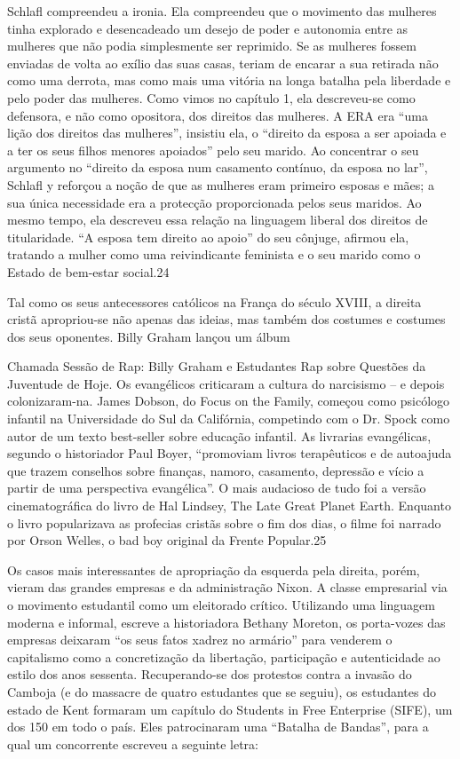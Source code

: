  \par 
Schlafl compreendeu a ironia. Ela compreendeu que o movimento das mulheres tinha explorado e desencadeado um desejo de poder e autonomia entre as mulheres que não podia simplesmente ser reprimido. Se as mulheres fossem enviadas de volta ao exílio das suas casas, teriam de encarar a sua retirada não como uma derrota, mas como mais uma vitória na longa batalha pela liberdade e pelo poder das mulheres. Como vimos no capítulo 1, ela descreveu-se como defensora, e não como opositora, dos direitos das mulheres. A ERA era “uma lição dos direitos das mulheres”, insistiu ela, o “direito da esposa a ser apoiada e a ter os seus filhos menores apoiados” pelo seu marido. Ao concentrar o seu argumento no “direito da esposa num casamento contínuo, da esposa no lar”, Schlafl y reforçou a noção de que as mulheres eram primeiro esposas e mães; a sua única necessidade era a protecção proporcionada pelos seus maridos. Ao mesmo tempo, ela descreveu essa relação na linguagem liberal dos direitos de titularidade. “A esposa tem direito ao apoio” do seu cônjuge, afirmou ela, tratando a mulher como uma reivindicante feminista e o seu marido como o Estado de bem-estar social.{\color{blue}24}
 \par 
Tal como os seus antecessores católicos na França do século XVIII, a direita cristã apropriou-se não apenas das ideias, mas também dos costumes e costumes dos seus oponentes. Billy Graham lançou um álbum
 \par 
Chamada Sessão de Rap: Billy Graham e Estudantes Rap sobre Questões da Juventude de Hoje. Os evangélicos criticaram a cultura do narcisismo – e depois colonizaram-na. James Dobson, do Focus on the Family, começou como psicólogo infantil na Universidade do Sul da Califórnia, competindo com o Dr. Spock como autor de um texto best-seller sobre educação infantil. As livrarias evangélicas, segundo o historiador Paul Boyer, “promoviam livros terapêuticos e de autoajuda que trazem conselhos sobre finanças, namoro, casamento, depressão e vício a partir de uma perspectiva evangélica”. O mais audacioso de tudo foi a versão cinematográfica do livro de Hal Lindsey, The Late Great Planet Earth. Enquanto o livro popularizava as profecias cristãs sobre o fim dos dias, o filme foi narrado por Orson Welles, o bad boy original da Frente Popular.{\color{blue}25}
 \par 
Os casos mais interessantes de apropriação da esquerda pela direita, porém, vieram das grandes empresas e da administração Nixon. A classe empresarial via o movimento estudantil como um eleitorado crítico. Utilizando uma linguagem moderna e informal, escreve a historiadora Bethany Moreton, os porta-vozes das empresas deixaram “os seus fatos xadrez no armário” para venderem o capitalismo como a concretização da libertação, participação e autenticidade ao estilo dos anos sessenta. Recuperando-se dos protestos contra a invasão do Camboja (e do massacre de quatro estudantes que se seguiu), os estudantes do estado de Kent formaram um capítulo do Students in Free Enterprise (SIFE), um dos {\color{blue}150} em todo o país. Eles patrocinaram uma “Batalha de Bandas”, para a qual um concorrente escreveu a seguinte letra:
